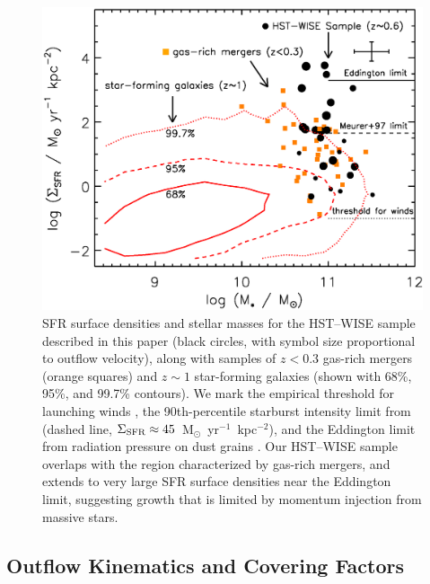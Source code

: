 \documentclass[apj]{emulateapj}
\newcommand{\units}{M$_{\odot}$~yr$^{-1}$~kpc$^{-2}$}
\newcommand{\sigmasfr}{\Sigma_{\textnormal{\scriptsize{SFR}}}}
\begin{document}
\begin{figure}[!t]
\begin{center}
\includegraphics[angle=0,scale=.8]{sigmasfr.ps} 
\caption{SFR surface densities and stellar masses for the HST--WISE
  sample described in this paper (black circles, with symbol size
  proportional to outflow velocity), along with samples of $z<0.3$
  gas-rich mergers (orange squares) and $z\sim1$ star-forming galaxies
  (shown with 68\%, 95\%, and 99.7\% contours).  We mark the empirical
  threshold for launching winds \citep[dotted line,
    $\sigmasfr\approx0.1$~\units;][]{hec02}, the 90th-percentile
  starburst intensity limit from \citet{meu97} (dashed line,
  $\sigmasfr\approx45$~\units), and the Eddington limit from radiation
  pressure on dust grains \citep[solid line,
    $\sigmasfr\approx2000$~\units;][]{mur05,tho05,hop10}.  Our
  HST--WISE sample overlaps with the region characterized by gas-rich
  mergers, and extends to very large SFR surface densities near the
  Eddington limit, suggesting growth that is limited by momentum
  injection from massive stars.}
\label{fig:sigmasfr}
\end{center}
\end{figure}

\subsection{Outflow Kinematics and Covering Factors}
\end{document}
